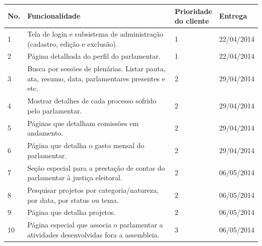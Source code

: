 \documentclass[12pt, a4paper]{article}
\begin{document}
    \begin{longtabu}{X[-1, r] | X | X[-1, r] | X[-1]}
            \hline
            \textbf{No.} &
            \textbf{Funcionalidade} &
            \textbf{Prioridade \newline do cliente} &
            \textbf{Entrega}
            \\ \hline

            1 &
            Tela de login e subsistema de administração (cadastro, edição e exclusão). 
            & 1 & 22/04/2014
            \\ \hline
            
            2 &
            Página detalhada do perfil do parlamentar. &
            1 & 22/04/2014
            \\ \hline

            3 &
            Busca por sessões de plenárias. Listar pauta, ata, resumo, data,
            parlamentares presentes e etc. &
            2 & 29/04/2014
            \\ \hline

            4 &
            Mostrar detalhes de cada processo sofrido pelo parlamentar. &
            2 & 29/04/2014
            \\ \hline

            5 &
            Páginas que detalham comissões em andamento. &
            2 & 29/04/2014
            \\ \hline

            6 &
            Página que detalha o gasto mensal do parlamentar.
            & 2 & 29/04/2014
            \\ \hline

            7 &
            Seção especial para a prestação de contas do parlamentar à justiça
            eleitoral. &
            2 & 06/05/2014
            \\ \hline

            8  &
            Pesquisar projetos por categoria/natureza, por data, por status ou
            tema. &
            2 & 06/05/2014
            \\ \hline

            9  &
            Página que detalha projetos. &
            2 & 06/05/2014
            \\ \hline

            10  &
            Página especial que associa o parlamentar a atividades
            desenvolvidas fora a assembleia. &
            3 & 06/05/2014
            \\ \hline


\end{longtabu}
\end{document}
